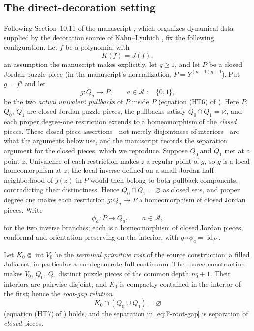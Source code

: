 \documentclass[11pt,reqno]{amsart}
\theoremstyle{definition}
\theoremstyle{remark}
\newcommand{\Int}{\operatorname{int}}
\newcommand{\id}{\operatorname{id}}
\begin{document}
\subsection{The direct-decoration setting}\label{subsec:F-setting}

Following Section~10.11 of the manuscript \cite{MWman}, which organizes
dynamical data supplied by the decoration source of Kahn--Lyubich
\cite{KL08}, fix the following configuration.  Let $f$ be a polynomial
with
\[
K(f)=J(f),
\]
an assumption the manuscript makes explicitly, let $q\ge1$, and let $P$ be
a closed Jordan puzzle piece (in the manuscript's normalization,
$P=Y^{(n-1)q+1}$).  Put $g=f^{q}$ and let
\begin{equation}\label{eq:F-pullbacks}
g\colon Q_a\longrightarrow P,\qquad a\in\mathcal A:=\{0,1\},
\end{equation}
be the two \emph{actual univalent pullbacks} of $P$ inside $P$ (equation
(HT6) of \cite{MWman}).  Here $P$, $Q_0$, $Q_1$ are closed Jordan puzzle
pieces, the pullbacks satisfy $Q_0\cap Q_1=\varnothing$, and each proper
degree-one restriction extends to a homeomorphism of the \emph{closed}
pieces.  These closed-piece assertions---not merely disjointness of
interiors---are what the arguments below use, and the manuscript records
the separation argument for the closed pieces, which we reproduce.
Suppose $Q_0$ and $Q_1$ met at a point $z$.  Univalence of each
restriction makes $z$ a regular point of $g$, so $g$ is a local
homeomorphism at $z$; the local inverse defined on a small Jordan
half-neighborhood of $g(z)$ in $P$ would then belong to both pullback
components, contradicting their distinctness.  Hence
$Q_0\cap Q_1=\varnothing$ as closed sets, and proper degree one makes each
restriction $g\colon Q_a\to P$ a homeomorphism of closed Jordan pieces.
Write
\[
\phi_a\colon P\longrightarrow Q_a,\qquad a\in\mathcal A,
\]
for the two inverse branches; each is a homeomorphism of closed Jordan
pieces, conformal and orientation-preserving on the interior, with
$g\circ\phi_a=\id_P$.

Let $K_0\Subset\Int V_0$ be the \emph{terminal primitive root} of the
source construction: a filled Julia set, in particular a nondegenerate
full continuum.  The source construction makes $V_0$, $Q_0$, $Q_1$
distinct puzzle pieces of the common depth $nq+1$.  Their interiors are
pairwise disjoint, and $K_0$ is compactly contained in the interior of the
first; hence the \emph{root-gap relation}
\begin{equation}\label{eq:F-root-gap}
K_0\cap(Q_0\cup Q_1)=\varnothing
\end{equation}
(equation (HT7) of \cite{MWman}) holds, and the separation in
\eqref{eq:F-root-gap} is separation of \emph{closed} pieces.
\end{document}
